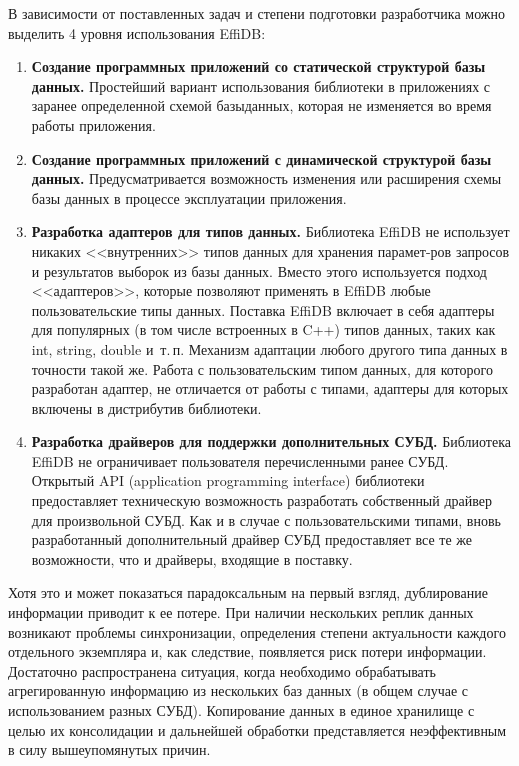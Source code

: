 \begin{multicols}{2}
В зависимости от поставленных задач и степени подготовки разработчика можно 
выделить 4 уровня использования EffiDB:
\begin{enumerate}
\item \textbf{Создание программных приложений со статической структурой базы 
данных.} Простейший вариант использования библиотеки в приложениях с заранее 
определенной схемой базы\linebreak данных, которая не изменяется во время работы 
приложения.
\item \textbf{Создание программных приложений с динамической структурой 
базы данных.} Предусматривается возможность изменения или расширения схемы 
базы данных в процессе эксплуатации приложения.
\item \textbf{Разработка адаптеров для типов данных.} Биб\-ли\-о\-тека EffiDB не использует 
никаких <<внут\-рен\-них>> типов данных для хранения парамет-\linebreak ров запросов и 
результатов выборок из базы данных. Вмес\-то этого используется подход 
<<адаптеров>>, которые позволяют применять в \mbox{EffiDB} любые пользовательские типы 
данных. Поставка \mbox{EffiDB} включает в себя адаптеры для популярных (в том числе 
встроенных в C++) типов данных, таких как int, string, double и~т.\,п. Механизм 
адаптации любого другого типа данных в точности такой же. Работа с 
пользовательским типом данных, для которого разработан адаптер, не отличается от 
работы с типами, адаптеры для которых включены в дистрибутив библиотеки.
\item \textbf{Разработка драйверов для поддержки дополнительных СУБД.} 
Библиотека EffiDB не ограничивает пользователя перечисленными ранее СУБД. 
Открытый API (application programming interface)
библиотеки предоставляет техническую возможность разработать 
собственный драйвер для произвольной СУБД. Как и в случае с пользовательскими 
типами, вновь разработанный дополнительный драйвер СУБД предостав\-ляет все те же 
возможности, что и драйверы, входящие в поставку.
\end{enumerate}

Хотя это и может показаться парадоксальным на первый взгляд, дублирование 
информации приводит к ее потере. При наличии нескольких реп\-лик данных возникают 
проблемы синхронизации, определения степени актуальности каждого отдельного 
экземпляра и, как следствие, появляется риск потери информации. Достаточно 
распространена ситуация, когда необходимо обрабатывать агрегированную информацию 
из нескольких баз данных (в общем случае с использованием разных СУБД). Копирование 
данных в единое хранилище с целью их консолидации и дальнейшей обработки 
пред\-став\-ля\-ет\-ся неэффективным в силу вышеупомянутых причин.


\end{multicols}
